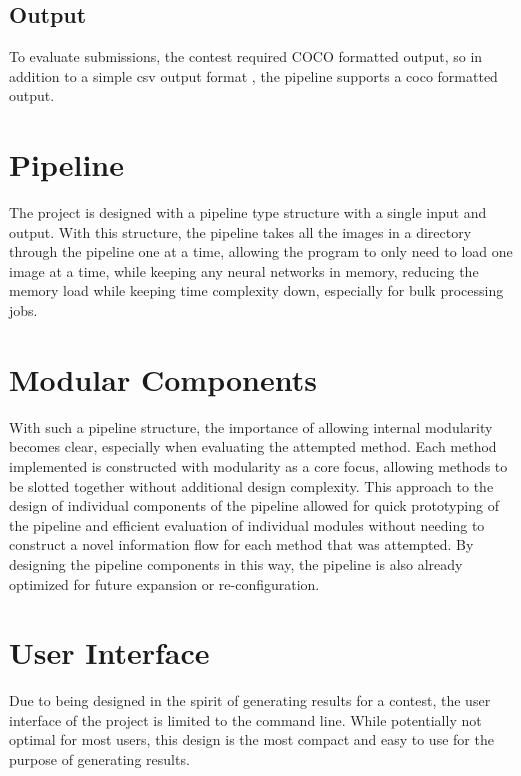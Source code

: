 \subsection{Output}

To evaluate submissions, the contest required COCO formatted output, so in addition to a simple csv output format , the pipeline supports a coco formatted output.

\section{Pipeline}

The project is designed with a pipeline type structure with a single input and output. With this structure, the pipeline takes all the images in a directory through the pipeline one at a time, allowing the program to only need to load one image at a time, while keeping any neural networks in memory, reducing the memory load while keeping time complexity down, especially for bulk processing jobs.

\section{Modular Components}

With such a pipeline structure, the importance of allowing internal modularity becomes clear, especially when evaluating the attempted method. Each method implemented is constructed with modularity as a core focus, allowing methods to be slotted together without additional design complexity. This approach to the design of individual components of the pipeline allowed for quick prototyping of the pipeline and efficient evaluation of individual modules without needing to construct a novel information flow for each method that was attempted. By designing the pipeline components in this way, the pipeline is also already optimized for future expansion or re-configuration.

\section{User Interface}

Due to being designed in the spirit of generating results for a contest, the user interface of the project is limited to the command line. While potentially not optimal for most users, this design is the most compact and easy to use for the purpose of generating results.
